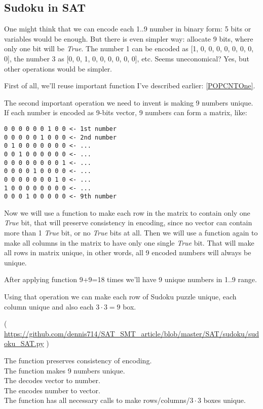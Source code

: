 \subsection{Sudoku in SAT}
\label{Sudoku_SAT}

One might think that we can encode each 1..9 number in binary form: 5 bits or variables would be enough.
But there is even simpler way: allocate 9 bits, where only one bit will be \textit{True}.
The number 1 can be encoded as [1, 0, 0, 0, 0, 0, 0, 0, 0], the number 3 as [0, 0, 1, 0, 0, 0, 0, 0, 0], etc.
Seems uneconomical? Yes, but other operations would be simpler.

First of all, we'll reuse important  function I've described earlier: \ref{POPCNTOne}.

The second important operation we need to invent is making 9 numbers unique.
If each number is encoded as 9-bits vector, 9 numbers can form a matrix, like:

\begin{lstlisting}
0 0 0 0 0 0 1 0 0 <- 1st number
0 0 0 0 0 1 0 0 0 <- 2nd number
0 1 0 0 0 0 0 0 0 <- ...
0 0 1 0 0 0 0 0 0 <- ...
0 0 0 0 0 0 0 0 1 <- ...
0 0 0 0 1 0 0 0 0 <- ...
0 0 0 0 0 0 0 1 0 <- ...
1 0 0 0 0 0 0 0 0 <- ...
0 0 0 1 0 0 0 0 0 <- 9th number
\end{lstlisting}

Now we will use a  function to make each row in the matrix to contain only one \textit{True} bit, that will
preserve consistency in encoding, since no vector can contain more than 1 \textit{True} bit, or no \textit{True} bits at all.
Then we will use a  function again to make all columns in the matrix to have only one single \textit{True} bit.
That will make all rows in matrix unique, in other words, all 9 encoded numbers will always be unique.

After applying  function 9+9=18 times we'll have 9 unique numbers in 1..9 range.

Using that operation we can make each row of Sudoku puzzle unique, each column unique and also each $3 \cdot 3=9$ box.


( \url{https://github.com/dennis714/SAT_SMT_article/blob/master/SAT/sudoku/sudoku_SAT.py} )

The  function preserves consistency of encoding.\\
The  function makes 9 numbers unique.\\
The  decodes vector to number.\\
The  encodes number to vector.\\
The  function has all necessary calls to make rows/columns/$3\cdot 3$ boxes unique.

